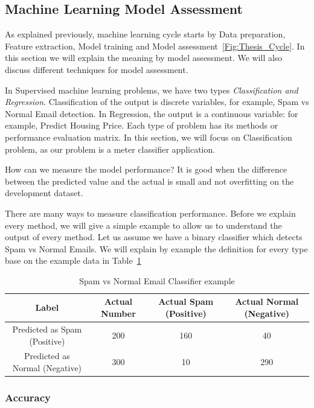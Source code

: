 \subsection{Machine Learning Model Assessment}

As explained previously, machine learning cycle starts by Data preparation, Feature extraction, Model training and Model assessment~\ref{Fig:Thesis_Cycle}. In this section we will explain the meaning by model assessment. We will also discuss different techniques for model assessment.

In Supervised machine learning problems, we have two types \textit{Classification and Regression}. Classification of the output is discrete variables, for example, Spam vs Normal Email detection. In Regression, the output is a continuous variable: for example, Predict Housing Price. Each type of problem has its methods or performance evaluation matrix. In this section, we will focus on Classification problem, as our problem is a meter classifier application.

How can we measure the model performance? It is good when the difference between the predicted value and the actual is small and not overfitting on the development dataset.

There are many ways to measure classification performance. Before we explain every method, we will give a simple example to allow us to understand the output of every method. Let us assume we have a binary classifier which detects Spam vs Normal Emails. We will explain by example the definition for every type base on the example data in Table~\ref{Tab:EmailClassifier}%
\begin{table}[t]
 \centering
 \begin{tabular}{c c c c}
  \toprule
  \textbf{Label}& \textbf{Actual Number}& \textbf{Actual Spam (Positive)} & \textbf{Actual Normal (Negative)}\\
  \midrule
  Predicted as Spam (Positive)  & 200 & \cellcolor{green!25}160 & \cellcolor{red!25}40 \\
  Predicted as Normal (Negative)   & 300  & \cellcolor{red!25}10  & \cellcolor{green!25}290\\
  \bottomrule
 \end{tabular}
 \caption{Spam vs Normal Email Classifier example}\label{Tab:EmailClassifier}
\end{table}%
%
\subsubsection{Accuracy}

